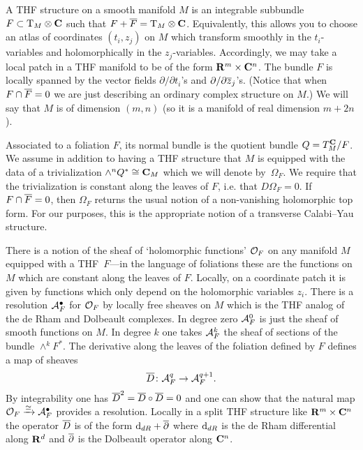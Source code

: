 A THF structure on a smooth manifold $M$ is an integrable subbundle $F \subset \T_M \otimes \C$ such that $F + \Bar{F} = \T_M \otimes \C$.
Equivalently, this allows you to choose an atlas of coordinates $(t_i, z_j)$ on $M$ which transform smoothly in the $t_i$-variables and holomorphically in the $z_j$-variables. 
Accordingly, we may take a local patch in a THF manifold to be of the form $\R^m \times \C^n$.
The bundle $F$ is locally spanned by the vector fields $\partial / \partial t_i$'s and $\del/\del \zbar_j$'s.
(Notice that when $F \cap \Bar{F} = 0$ we are just describing an ordinary complex structure on $M$.)
We will say that $M$ is of dimension $(m,n)$ (so it is a manifold of real dimension $m + 2n$).

Associated to a foliation $F$, its normal bundle is the quotient bundle $Q = T^{\C}_{M}/F$. We assume in addition to having a THF structure that $M$ is equipped with the data of a trivialization $\wedge^{n} Q^* \cong \C_{M}$ which we will denote by~$\Omega_F$. We require that the trivialization is constant along the leaves of $F$, i.e. that $D\Omega_{F} = 0$. If $F \cap \Bar{F} = 0$, then $\Omega_F$ returns the usual notion of a non-vanishing holomorphic top form. For our purposes, this is the appropriate notion of a transverse Calabi--Yau structure.

There is a notion of the sheaf of `holomorphic functions' $\cO_F$ on any manifold $M$ equipped with a THF~$F$---in the language of foliations these are the functions on $M$ which are constant along the leaves of $F$.
Locally, on a coordinate patch it is given by functions which only depend on the holomorphic variables $z_i$.
There is a resolution $\cA^\bu_F$ for $\cO_F$ by locally free sheaves on $M$ which is the THF analog of the de Rham and Dolbeault complexes. 
In degree zero $\cA^0_F$ is just the sheaf of smooth functions on $M$.
In degree $k$ one takes $\cA^k_F$ the sheaf of sections of the bundle $\wedge^k F^*$.
The derivative along the leaves of the foliation defined by $F$ defines a map of sheaves
\[
\thfd \colon \cA^{q}_F \to \cA^{q+1}_F  .
\]
By integrability one has $\thfd^2 = \thfd \circ \thfd = 0$ and one can show that the natural map $\cO_F \xto{\simeq} \cA^\bu_F$ provides a resolution.
Locally in a split THF structure like $\R^m \times \C^n$ the operator $\thfd$ is of the form $\d_{dR} + \dbar$ where $\d_{dR}$ is the de Rham differential along $\R^d$ and $\dbar$ is the Dolbeault operator along $\C^n$.



